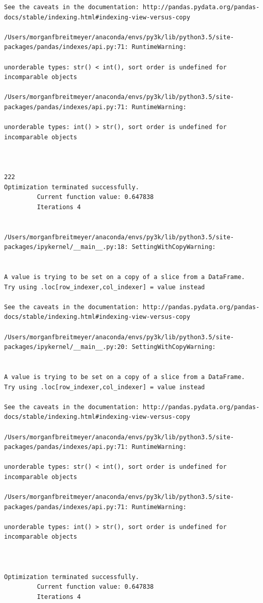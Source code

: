 \begin{lstlisting}
See the caveats in the documentation: http://pandas.pydata.org/pandas-docs/stable/indexing.html#indexing-view-versus-copy

/Users/morganfbreitmeyer/anaconda/envs/py3k/lib/python3.5/site-packages/pandas/indexes/api.py:71: RuntimeWarning:

unorderable types: str() < int(), sort order is undefined for incomparable objects

/Users/morganfbreitmeyer/anaconda/envs/py3k/lib/python3.5/site-packages/pandas/indexes/api.py:71: RuntimeWarning:

unorderable types: int() > str(), sort order is undefined for incomparable objects



222
Optimization terminated successfully.
         Current function value: 0.647838
         Iterations 4


/Users/morganfbreitmeyer/anaconda/envs/py3k/lib/python3.5/site-packages/ipykernel/__main__.py:18: SettingWithCopyWarning:


A value is trying to be set on a copy of a slice from a DataFrame.
Try using .loc[row_indexer,col_indexer] = value instead

See the caveats in the documentation: http://pandas.pydata.org/pandas-docs/stable/indexing.html#indexing-view-versus-copy

/Users/morganfbreitmeyer/anaconda/envs/py3k/lib/python3.5/site-packages/ipykernel/__main__.py:20: SettingWithCopyWarning:


A value is trying to be set on a copy of a slice from a DataFrame.
Try using .loc[row_indexer,col_indexer] = value instead

See the caveats in the documentation: http://pandas.pydata.org/pandas-docs/stable/indexing.html#indexing-view-versus-copy

/Users/morganfbreitmeyer/anaconda/envs/py3k/lib/python3.5/site-packages/pandas/indexes/api.py:71: RuntimeWarning:

unorderable types: str() < int(), sort order is undefined for incomparable objects

/Users/morganfbreitmeyer/anaconda/envs/py3k/lib/python3.5/site-packages/pandas/indexes/api.py:71: RuntimeWarning:

unorderable types: int() > str(), sort order is undefined for incomparable objects



Optimization terminated successfully.
         Current function value: 0.647838
         Iterations 4



\end{lstlisting}
